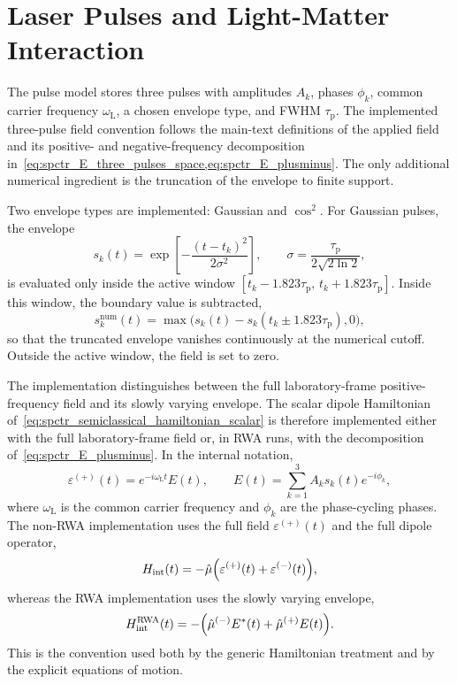 \section{Laser Pulses and Light-Matter Interaction}
\label{app:sec:laser_field}

The pulse model stores three pulses with amplitudes \(A_k\), phases \(\phi_k\),
common carrier frequency \(\omega_{\mathrm{L}}\), a chosen envelope type, and FWHM
\(\tau_{\mathrm{p}}\). The implemented three-pulse field convention follows the
main-text definitions of the applied field and its positive- and
negative-frequency decomposition
in~\cref{eq:spctr_E_three_pulses_space,eq:spctr_E_plusminus}. The only
additional numerical ingredient is the truncation of the envelope to finite
support.

Two envelope types are implemented: Gaussian and \(\cos^2\). For Gaussian
pulses, the envelope
\begin{equation}
\label{eq:laser_envelope}
s_k(t)
=
\exp\!\left[
-\frac{(t-t_k)^2}{2\sigma^2}
\right],
\qquad
\sigma
=
\frac{\tau_{\mathrm{p}}}{2\sqrt{2\ln 2}},
\end{equation}
is evaluated only inside the active window
\([t_k-1.823\tau_{\mathrm{p}},\,t_k+1.823\tau_{\mathrm{p}}]\). Inside this
window, the boundary value is subtracted,
\[
s_k^{\mathrm{num}}(t)
=
\max\!\bigl(s_k(t)-s_k(t_k \pm 1.823\tau_{\mathrm{p}}),0\bigr),
\]
so that the truncated envelope vanishes continuously at the numerical cutoff.
Outside the active window, the field is set to zero.

The implementation distinguishes between the full laboratory-frame
positive-frequency field and its slowly varying envelope. The scalar dipole
Hamiltonian of~\autoref{eq:spctr_semiclassical_hamiltonian_scalar} is therefore
implemented either with the full laboratory-frame field or, in RWA runs, with
the decomposition of~\autoref{eq:spctr_E_plusminus}. In the internal notation,
\[
\varepsilon^{(+)}(t)
=
e^{-i\omega_{\mathrm{L}} t} E(t),
\qquad
E(t)
=
\sum_{k=1}^{3} A_k s_k(t)e^{-i\phi_k},
\]
where \(\omega_{\mathrm{L}}\) is the common carrier frequency and \(\phi_k\) are the
phase-cycling phases. The non-RWA implementation uses the full field
\(\varepsilon^{(+)}(t)\) and the full dipole operator,
\[
H_{\mathrm{int}}(t)
=
-\hat{\mu}\Bigl(\varepsilon^{(+)}(t)+\varepsilon^{(-)}(t)\Bigr),
\]
whereas the RWA implementation uses the slowly varying envelope,
\begin{equation}
\label{eq:app_rwa_interaction_hamiltonian}
H_{\mathrm{int}}^{\mathrm{RWA}}(t)
=
-\Bigl(\hat{\mu}^{(-)}E^{*}(t)+\hat{\mu}^{(+)}E(t)\Bigr).
\end{equation}
This is the convention used both by the generic Hamiltonian treatment and by
the explicit equations of motion.

